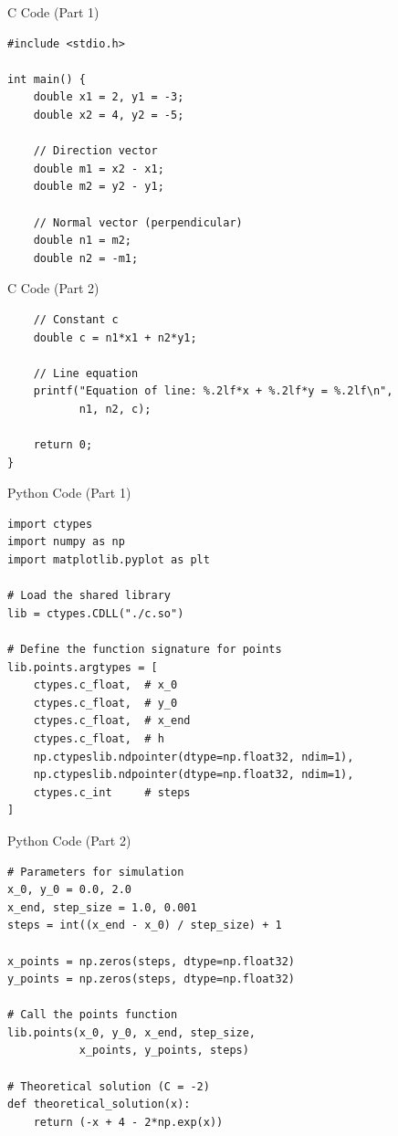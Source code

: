 \documentclass{beamer}
\begin{document}
\begin{frame}[fragile]{C Code (Part 1)}
\lstset{language=C}
\begin{lstlisting}
#include <stdio.h>

int main() {
    double x1 = 2, y1 = -3;
    double x2 = 4, y2 = -5;

    // Direction vector
    double m1 = x2 - x1;
    double m2 = y2 - y1;

    // Normal vector (perpendicular)
    double n1 = m2;
    double n2 = -m1;
\end{lstlisting}
\end{frame}

\begin{frame}[fragile]{C Code (Part 2)}
\lstset{language=C}
\begin{lstlisting}
    // Constant c
    double c = n1*x1 + n2*y1;

    // Line equation
    printf("Equation of line: %.2lf*x + %.2lf*y = %.2lf\n",
           n1, n2, c);

    return 0;
}
\end{lstlisting}
\end{frame}

\begin{frame}[fragile]{Python Code (Part 1)}
\lstset{language=Python}
\begin{lstlisting}
import ctypes
import numpy as np
import matplotlib.pyplot as plt

# Load the shared library
lib = ctypes.CDLL("./c.so")

# Define the function signature for points
lib.points.argtypes = [
    ctypes.c_float,  # x_0
    ctypes.c_float,  # y_0
    ctypes.c_float,  # x_end
    ctypes.c_float,  # h
    np.ctypeslib.ndpointer(dtype=np.float32, ndim=1),  
    np.ctypeslib.ndpointer(dtype=np.float32, ndim=1),  
    ctypes.c_int     # steps
]
\end{lstlisting}
\end{frame}

\begin{frame}[fragile]{Python Code (Part 2)}
\lstset{language=Python}
\begin{lstlisting}
# Parameters for simulation
x_0, y_0 = 0.0, 2.0
x_end, step_size = 1.0, 0.001
steps = int((x_end - x_0) / step_size) + 1

x_points = np.zeros(steps, dtype=np.float32)
y_points = np.zeros(steps, dtype=np.float32)

# Call the points function
lib.points(x_0, y_0, x_end, step_size, 
           x_points, y_points, steps)

# Theoretical solution (C = -2)
def theoretical_solution(x):
    return (-x + 4 - 2*np.exp(x))
\end{lstlisting}
\end{frame}
\end{document}
